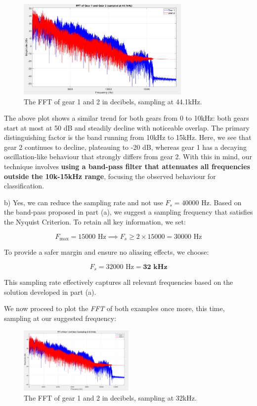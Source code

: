 \documentclass{article}
\begin{document}
\begin{figure}[h]
    \centering
    \includegraphics[width=0.75\textwidth]{FFT in dB (44.1kHz).png}
    \caption{The FFT of gear 1 and 2 in decibels, sampling at 44.1kHz.}
    \label{fig:fft_44.1kHz}
\end{figure}

The above plot shows a similar trend for both gears from 0 to 10kHz: both gears start at most at 50 dB and steadily decline with noticeable overlap. The primary distinguishing factor is the band running from 10kHz to 15kHz. Here, we see that gear 2 continues to decline, plateauing to -20 dB, whereas gear 1 has a decaying oscillation-like behaviour that strongly differs from gear 2. With this in mind, our technique involves \textbf{using a band-pass filter that attenuates all frequencies outside the 10k-15kHz range}, focusing the observed behaviour for classification.

\vspace{1cm}

b) Yes, we can reduce the sampling rate and not use \( F_s = 40000\) Hz. Based on the band-pass proposed in part (a), we suggest a sampling frequency that satisfies the Nyquist Criterion. To retain all key information, we set:

\[
F_{\text{max}} = 15000 \text{ Hz} \implies F_s \geq 2 \times 15000 = 30000 \text{ Hz}
\]

To provide a safer margin and ensure no aliasing effects, we choose:

\[
F_s = 32000 \text{ Hz} = \textbf{32 kHz}
\]

This sampling rate effectively captures all relevant frequencies based on the solution developed in part (a). 

We now proceed to plot the \textit{FFT} of both examples once more, this time, sampling at our suggested frequency:

\begin{figure}[h]
    \centering
    \includegraphics[width=0.5\textwidth]{FFT in dB (32kHz).png}
    \caption{The FFT of gear 1 and 2 in decibels, sampling at 32kHz.}
    \label{fig:enter-label}
\end{figure}
\end{document}
